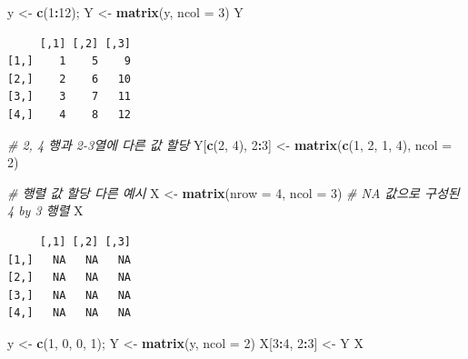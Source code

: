 \documentclass[
  11pt,
]{krantz}
\newenvironment{Shaded}{\begin{snugshade}}{\end{snugshade}}
\newcommand{\CommentTok}[1]{\textcolor[rgb]{0.37,0.37,0.37}{\textit{#1}}}
\newcommand{\DataTypeTok}[1]{\textcolor[rgb]{0.27,0.27,0.27}{#1}}
\newcommand{\DecValTok}[1]{\textcolor[rgb]{0.06,0.06,0.06}{#1}}
\newcommand{\KeywordTok}[1]{\textcolor[rgb]{0.27,0.27,0.27}{\textbf{#1}}}
\newcommand{\NormalTok}[1]{#1}
\newcommand{\OperatorTok}[1]{\textcolor[rgb]{0.43,0.43,0.43}{\textbf{#1}}}
\newcommand{\StringTok}[1]{\textcolor[rgb]{0.5,0.5,0.5}{#1}}
\begin{document}
\footnotesize

\begin{Shaded}
\begin{Highlighting}[]
\NormalTok{y <-}\StringTok{ }\KeywordTok{c}\NormalTok{(}\DecValTok{1}\OperatorTok{:}\DecValTok{12}\NormalTok{); Y <-}\StringTok{ }\KeywordTok{matrix}\NormalTok{(y, }\DataTypeTok{ncol =} \DecValTok{3}\NormalTok{)}
\NormalTok{Y}
\end{Highlighting}
\end{Shaded}

\begin{verbatim}
     [,1] [,2] [,3]
[1,]    1    5    9
[2,]    2    6   10
[3,]    3    7   11
[4,]    4    8   12
\end{verbatim}

\begin{Shaded}
\begin{Highlighting}[]
\CommentTok{# 2, 4 행과 2-3열에 다른 값 할당}
\NormalTok{Y[}\KeywordTok{c}\NormalTok{(}\DecValTok{2}\NormalTok{, }\DecValTok{4}\NormalTok{), }\DecValTok{2}\OperatorTok{:}\DecValTok{3}\NormalTok{] <-}\StringTok{ }\KeywordTok{matrix}\NormalTok{(}\KeywordTok{c}\NormalTok{(}\DecValTok{1}\NormalTok{, }\DecValTok{2}\NormalTok{, }\DecValTok{1}\NormalTok{, }\DecValTok{4}\NormalTok{), }\DataTypeTok{ncol =} \DecValTok{2}\NormalTok{)}

\CommentTok{# 행렬 값 할당 다른 예시}
\NormalTok{X <-}\StringTok{ }\KeywordTok{matrix}\NormalTok{(}\DataTypeTok{nrow =} \DecValTok{4}\NormalTok{, }\DataTypeTok{ncol =} \DecValTok{3}\NormalTok{) }\CommentTok{# NA 값으로 구성된 4 by 3 행렬}
\NormalTok{X}
\end{Highlighting}
\end{Shaded}

\begin{verbatim}
     [,1] [,2] [,3]
[1,]   NA   NA   NA
[2,]   NA   NA   NA
[3,]   NA   NA   NA
[4,]   NA   NA   NA
\end{verbatim}

\begin{Shaded}
\begin{Highlighting}[]
\NormalTok{y <-}\StringTok{ }\KeywordTok{c}\NormalTok{(}\DecValTok{1}\NormalTok{, }\DecValTok{0}\NormalTok{, }\DecValTok{0}\NormalTok{, }\DecValTok{1}\NormalTok{); Y <-}\StringTok{ }\KeywordTok{matrix}\NormalTok{(y, }\DataTypeTok{ncol =} \DecValTok{2}\NormalTok{)}
\NormalTok{X[}\DecValTok{3}\OperatorTok{:}\DecValTok{4}\NormalTok{, }\DecValTok{2}\OperatorTok{:}\DecValTok{3}\NormalTok{] <-}\StringTok{ }\NormalTok{Y}
\NormalTok{X}
\end{Highlighting}
\end{Shaded}
\end{document}
